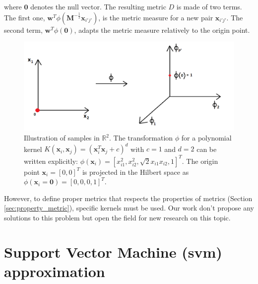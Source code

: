 \noindent where $\textbf{0}$ denotes the null vector. The resulting metric $D$ is made of two terms. The first one, $\textbf{w}^T \phi(\textbf{M}^{-\frac{1}{2}}\textbf{x}_{i'j'})$, is the metric measure for a new pair $\textbf{x}_{i'j'}$. The second term, $\textbf{w}^T \phi(\textbf{0})$, adapts the metric measure relatively to the origin point. 

\begin{figure}[h!]
\centering
\includegraphics[width=0.9\linewidth]{images/Kernel_nonHomogene}
\caption{Illustration of samples in $\mathbb{R}^2$. The transformation $\phi$ for a polynomial kernel $K(\textbf{x}_i,\textbf{x}_j)=(\textbf{x}_i^T \textbf{x}_j + c)^d$ with $c=1$ and $d=2$ can be written explicitly: $\phi(\textbf{x}_i)= [x_{i1}^2, x_{i2}^2, \sqrt{2} x_{i1} x_{i2}, 1]^T$. The origin point $\textbf{x}_i=[0,0]^T$ is projected in the Hilbert space as $\phi(\textbf{x}_i=\textbf{0}) = [0, 0, 0, 1]^T$.}
\label{fig:Kernel_nonHomogene}
\end{figure}

However, to define proper metrics that respects the properties of metrics (Section \ref{sec:property_metric}), specific kernels must be used. Our work don't propose any solutions to this problem but open the field for new research on this topic. 



\section{Support Vector Machine ({\sc svm}) approximation}
